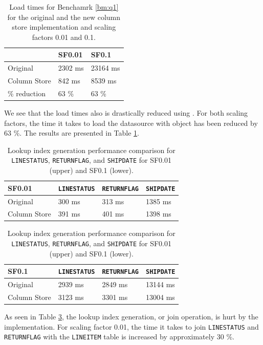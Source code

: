 \begin{table}
    \centering
    \begin{tabularx}{0.75\textwidth}{X | X X}
        & SF0.01 & SF0.1 \\ 
        \hline
        \hline
        Original & 2302 ms & 23164 ms \\
        Column Store & 842 ms & 8539 ms \\
        \% reduction & 63 \% & 63 \% \\
    \end{tabularx}
    \caption{Load times for Benchamrk \ref{bm:q1} for the original and the new column store implementation and scaling factors 0.01 and 0.1.} 
    \label{tab:non-blackbox-load}
\end{table}
We see that the load times also is drastically reduced using . For both scaling factors, the time it takes to load the datasource with object has been reduced by 63 \%. The results are presented in Table \ref{tab:non-blackbox-load}.

\begin{table}
    \centering
    \begin{tabularx}{0.9\textwidth}{X | X X X}
        SF0.01 & \texttt{LINESTATUS} & \texttt{RETURNFLAG} & \texttt{SHIPDATE}\\ 
        \hline
        \hline
        Original & 300 ms & 313 ms & 1385 ms \\
        Column Store & 391 ms & 401 ms & 1398 ms \\
    \end{tabularx}
    \newline
    \vspace*{1 cm}
    \newline
    \begin{tabularx}{0.9\textwidth}{X | X X X}
        SF0.1 & \texttt{LINESTATUS} & \texttt{RETURNFLAG} & \texttt{SHIPDATE}\\ 
        \hline
        \hline
        Original & 2939 ms & 2849 ms & 13144 ms \\
        Column Store & 3123 ms & 3301 ms & 13004 ms \\
    \end{tabularx}
    \caption{Lookup index generation performance comparison for \texttt{LINESTATUS}, \texttt{RETURNFLAG}, and \texttt{SHIPDATE} for SF0.01 (upper) and SF0.1 (lower).} 
    \label{tab:non-blackbox-lig}
\end{table}
As seen in Table \ref{tab:non-blackbox-lig}, the lookup index generation, or join operation, is hurt by the  implementation. For scaling factor 0.01, the time it takes to join \texttt{LINESTATUS} and \texttt{RETURNFLAG} with the \texttt{LINEITEM} table is increased by approximately 30 \%.


